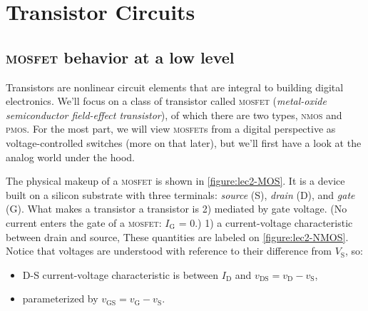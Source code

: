 \chapter{Transistor Circuits}


\section{\textsc{mosfet} behavior at a low level}
Transistors are nonlinear circuit elements that are integral to building digital electronics.
We'll focus on a class of transistor called \textsc{mosfet}
(\emph{metal-oxide semiconductor field-effect transistor}),
of which there are two types, \textsc{nmos} and \textsc{pmos}.
For the most part, we will view \textsc{mosfet}s from a digital perspective as voltage-controlled switches (more on that later), but we'll first have a look at the analog
world under the hood.

The physical makeup of a \textsc{mosfet} is shown in \autoref{figure:lec2-MOS}.
It is a device built on a silicon substrate with three terminals:
\emph{source} (S), \emph{drain} (D), and \emph{gate} (G).
What makes a transistor a transistor is
2) mediated by gate voltage. (No current enters the gate of a \textsc{mosfet}: \(I_\text{G}\) = 0.)
1) a current-voltage characteristic between drain and source,
These quantities are labeled on \autoref{figure:lec2-NMOS}.
Notice that voltages are understood with reference to their difference from \(V_\text{S}\), so:
\begin{itemize}
  \item D-S current-voltage characteristic is between \(I_\text{D}\) and \(v_\text{DS} = v_\text{D} - v_\text{S}\),%
  \item parameterized by \(v_\text{GS} = v_\text{G} - v_\text{S}\).
\end{itemize}


